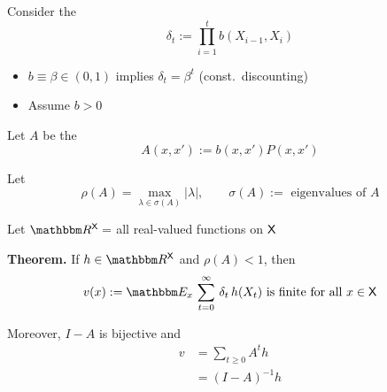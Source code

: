 \documentclass[xcolor=tex,dvipsnames]{beamer}
\begin{document}
\begin{frame}
    
    Consider the  
    \begin{equation*}
        \delta_t := \prod_{i=1}^t b(X_{i-1}, X_i) 
    \end{equation*}
    \vspace{0.4em}

    \begin{itemize}
        \item \Eg $b \equiv \beta \in (0, 1)$ implies $\delta_t = \beta^t$ (const.\
            discounting)
        \vspace{0.4em}
        \item Assume $b > 0$
    \end{itemize}

    \vspace{0.4em}
    \vspace{0.4em}
    \vspace{0.4em}

    Let $A$ be the 
    \begin{equation*}
        A(x,x') 
        := b(x, x') P(x, x') 
    \end{equation*}
    
    Let 
    \begin{equation*}
        \rho(A) = \max_{\lambda \in \sigma(A)} |\lambda|,
        \qquad
        \sigma(A) := \text{ eigenvalues of } A
    \end{equation*}


\end{frame}



\begin{frame}\label{slide:gdr}

    Let $\RR^\Xsf =$ all real-valued functions on $\mathsf X$
        \vspace{0.4em}
        \vspace{0.4em}

    \begin{block}{\vspace*{-3ex}}
    {\bf Theorem.} If $h \in \RR^\Xsf$ and $\rho(A)<1$, then 
    \vspace{0.4em}
    \begin{equation*}
        v(x) :=
            \EE_x \,
                \sum_{t=0}^\infty \, \delta_t \, h(X_t)
                \text{ is finite for all $x \in \Xsf$}
    \end{equation*}

    \vspace{0.4em}
    \vspace{0.4em}
    Moreover, $I-A$ is bijective and 
    \begin{align*}
        v  
        & = \sum_{t \geq 0} A^t h 
        \\
        & = (I - A)^{-1} h 
    \end{align*}
    \end{block}

\end{frame}
\end{document}
